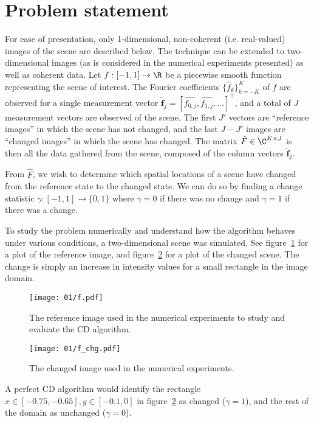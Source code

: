 \documentclass{article}
\begin{document}
\section{Problem statement}\label{sec:problem}

For ease of presentation, only 1-dimensional, non-coherent (i.e. real-valued) images of the scene are described below. The technique can be extended to two-dimensional images (as is considered in the numerical experiments presented) as well as coherent data. Let $f: [-1,1] \to \R$ be a piecewise smooth function representing the scene of interest. The Fourier coefficients $\{\hat{f}_k\}_{k=-K}^{K}$ of $f$ are observed for a single measurement vector $\hat{\mathbf{f}}_j = [\hat{f_{0,j}}, \hat{f_{1,j}}, \dots]^\top$, and a total of $J$ measurement vectors are observed of the scene. The first $J'$ vectors are ``reference images'' in which the scene has not changed, and the last $J-J'$ images are ``changed images'' in which the scene has changed.
The matrix $\hat{F} \in \C^{K \times J}$ is then all the data gathered from the scene, composed of the column vectors $\hat{\mathbf{f}}_j$.

From $\hat{F}$, we wish to determine which spatial locations of a scene have changed from the reference state to the changed state. We can do so by finding a change statistic $\gamma: [-1,1] \to \{0, 1\}$ where $\gamma=0$ if there was no change and $\gamma = 1$ if there was a change.

To study the problem numerically and understand how the algorithm behaves under various conditions, a two-dimensional scene was simulated. See figure~\ref{fig:f} for a plot of the reference image, and figure~\ref{fig:f_chg} for a plot of the changed scene. The change is simply an increase in intensity values for a small rectangle in the image domain.

\begin{figure}[H]
   \centering
   \texttt{[image: 01/f.pdf]}
   \caption{The reference image used in the numerical experiments to study and evaluate the CD algorithm.}
   \label{fig:f}
\end{figure}

\begin{figure}[H]
   \centering
   \texttt{[image: 01/f\_chg.pdf]}
   \caption{The changed image used in the numerical experiments.}
   \label{fig:f_chg}
\end{figure}

A perfect CD algorithm would identify the rectangle $x \in [-0.75,-0.65], y \in [-0.1, 0]$ in figure~\ref{fig:f_chg} as changed ($\gamma=1$), and the rest of the domain as unchanged ($\gamma=0$).
\end{document}
